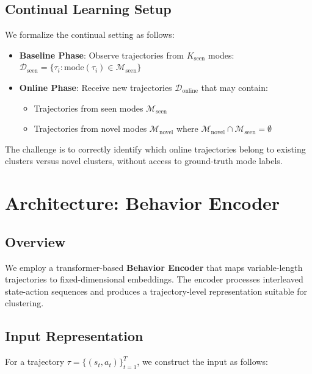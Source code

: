 \documentclass{article}
\begin{document}
\subsection{Continual Learning Setup}

We formalize the continual setting as follows:
\begin{itemize}
    \item \textbf{Baseline Phase}: Observe trajectories from $K_{\text{seen}}$ modes: $\mathcal{D}_{\text{seen}} = \{\tau_i : \text{mode}(\tau_i) \in \mathcal{M}_{\text{seen}}\}$
    \item \textbf{Online Phase}: Receive new trajectories $\mathcal{D}_{\text{online}}$ that may contain:
    \begin{itemize}
        \item Trajectories from seen modes $\mathcal{M}_{\text{seen}}$
        \item Trajectories from novel modes $\mathcal{M}_{\text{novel}}$ where $\mathcal{M}_{\text{novel}} \cap \mathcal{M}_{\text{seen}} = \emptyset$
    \end{itemize}
\end{itemize}

The challenge is to correctly identify which online trajectories belong to existing clusters versus novel clusters, without access to ground-truth mode labels.

\section{Architecture: Behavior Encoder}

\subsection{Overview}

We employ a transformer-based \textbf{Behavior Encoder} that maps variable-length trajectories to fixed-dimensional embeddings. The encoder processes interleaved state-action sequences and produces a trajectory-level representation suitable for clustering.

\subsection{Input Representation}

For a trajectory $\tau = \{(s_t, a_t)\}_{t=1}^{T}$, we construct the input as follows:
\end{document}
